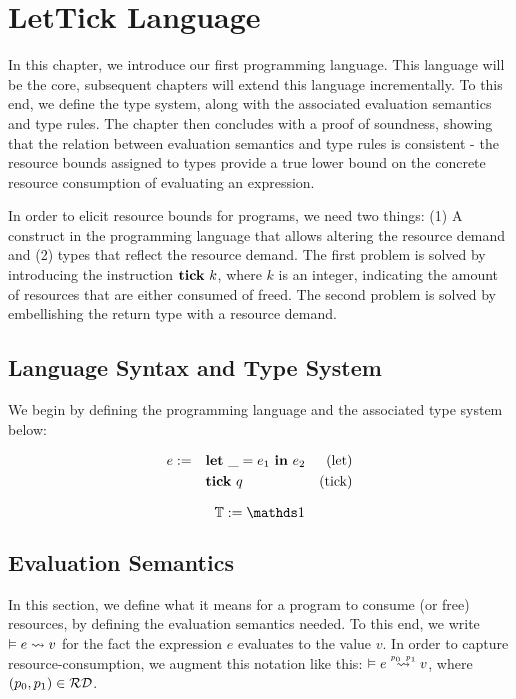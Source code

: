 \chapter{LetTick Language}

In this chapter, we introduce our first programming language. This language will be the core, subsequent chapters will extend this language incrementally. To this end, we define the type system, along with the associated evaluation semantics and type rules. The chapter then concludes with a proof of soundness, showing that the relation between evaluation semantics and type rules is consistent - the resource bounds assigned to types provide a true lower bound on the concrete resource consumption of evaluating an expression.

In order to elicit resource bounds for programs, we need two things: (1) A construct in the programming language that allows altering the resource demand and (2) types that reflect the resource demand. The first problem is solved by introducing the instruction \(\mathbf{tick}~k\), where \(k\) is an integer, indicating the amount of resources that are either consumed of freed. The second problem is solved by embellishing the return type with a resource demand.

\section{Language Syntax and Type System}
We begin by defining the programming language and the associated type system below:

\begin{definition}
   \label{def:prog-lang-4}

\begin{align*}
   e := ~~~ & \mathbf{let}~\_ = e_1~\mathbf{in}~e_2             & \text{(let)}\\
            & \mathbf{tick}~q                         & \text{(tick)}
\end{align*}
\end{definition}

\begin{definition}\label{fig:type-system}
   \[\type := \unit \]
\end{definition}

\section{Evaluation Semantics}
In this section, we define what it means for a program to consume (or free) resources, by defining the evaluation semantics needed. To this end, we write \(\evals{}{e}{v}{}{}\) for the fact the expression \(e\) evaluates to the value \(v\). In order to capture resource-consumption, we augment this notation like this: \(\evals{}{e}{v}{p_0}{p_1}\), where \((p_0, p_1) \in \mathcal{RD}\). 


